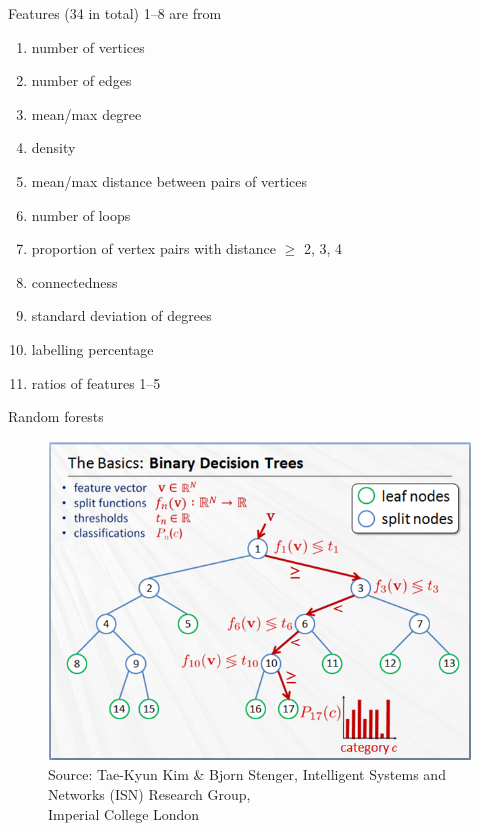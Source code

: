 \documentclass{beamer}
\begin{document}
\begin{frame}{Features (34 in total)}
  1--8 are from \cite{DBLP:conf/lion/KotthoffMS16}
  \begin{enumerate}
  \item number of vertices
  \item number of edges
  \item mean/max degree
  \item density
  \item mean/max distance between pairs of vertices
  \item number of loops
  \item proportion of vertex pairs with distance $\ge$ 2, 3, 4
  \item connectedness
    \pause
  \item standard deviation of degrees
  \item labelling percentage
    \pause
  \item ratios of features 1--5
  \end{enumerate}
\end{frame}

\begin{frame}{Random forests \parencite{DBLP:journals/ml/Breiman01}}
  \begin{figure}
    \centering
    \includegraphics[scale=0.5]{random_forests_2.png} \\
    {\tiny\color{gray}Source: Tae-Kyun Kim \& Bjorn Stenger, Intelligent Systems and Networks (ISN) Research Group,\\[-7pt] Imperial College London}
  \end{figure}
\end{frame}
\end{document}

